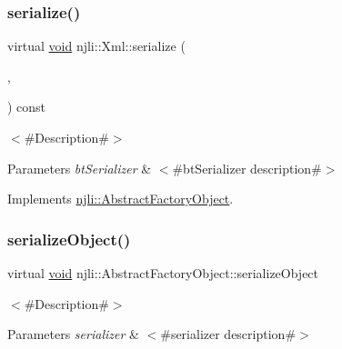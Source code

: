 \mbox{\label{classnjli_1_1_xml_a02b1771a550fcb07c7f0e887033dd7e4}} 
\subsubsection{\texorpdfstring{serialize()}{serialize()}}
{\footnotesize\ttfamily virtual \mbox{\hyperlink{_thread_8h_af1e856da2e658414cb2456cb6f7ebc66}{void}} njli\+::\+Xml\+::serialize (\begin{DoxyParamCaption}\item[{\mbox{\hyperlink{_thread_8h_af1e856da2e658414cb2456cb6f7ebc66}{void}} $\ast$}]{,  }\item[{bt\+Serializer $\ast$}]{ }\end{DoxyParamCaption}) const\hspace{0.3cm}{\ttfamily [virtual]}}

$<$\#\+Description\#$>$


\begin{DoxyParams}{Parameters}
{\em bt\+Serializer} & $<$\#bt\+Serializer description\#$>$ \\
\hline
\end{DoxyParams}


Implements \mbox{\hyperlink{classnjli_1_1_abstract_factory_object_aad2fbe86fb3bdecf02918a96b9c57976}{njli\+::\+Abstract\+Factory\+Object}}.

\mbox{\label{classnjli_1_1_xml_a4fc4bcd9d1930911474210c047372fc0}} 
\subsubsection{\texorpdfstring{serialize\+Object()}{serializeObject()}}
{\footnotesize\ttfamily virtual \mbox{\hyperlink{_thread_8h_af1e856da2e658414cb2456cb6f7ebc66}{void}} njli\+::\+Abstract\+Factory\+Object\+::serialize\+Object}

$<$\#\+Description\#$>$


\begin{DoxyParams}{Parameters}
{\em serializer} & $<$\#serializer description\#$>$ \\
\hline
\end{DoxyParams}
\mbox{\label{classnjli_1_1_xml_a087eb5f8d9f51cc476f12f1d10a3cb95}} 
